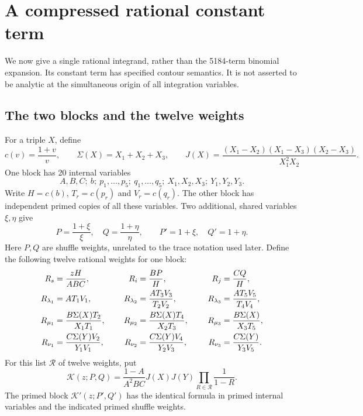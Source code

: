 \documentclass[11pt,letterpaper]{article}
\theoremstyle{remark}\newtheorem{remark}[theorem]{Remark}
\numberwithin{equation}{section}
\begin{document}
\section{A compressed rational constant term}\label{upo:rat:sec:kernel}
We now give a single rational integrand, rather than the 5184-term
binomial expansion. Its constant term has specified contour semantics.
It is not asserted to be analytic at the simultaneous origin of all
integration variables.

\subsection{The two blocks and the twelve weights}
For a triple $X$, define
\[
c(v)=\frac{1+v}{v},\qquad \Sigma(X)=X_1+X_2+X_3,
\qquad J(X)=\frac{(X_1-X_2)(X_1-X_3)(X_2-X_3)}{X_1^2X_2}.
\]
One block has 20 internal variables
\[
A,B,C;\ b;\ p_1,\ldots,p_5;\ q_1,\ldots,q_5;
\ X_1,X_2,X_3;\ Y_1,Y_2,Y_3.
\]
Write $H=c(b)$, $T_r=c(p_r)$ and $V_r=c(q_r)$.
The other block has independent primed copies of all these variables.
Two additional, shared variables $\xi,\eta$ give
\[
P=\frac{1+\xi}{\xi},\quad Q=\frac{1+\eta}{\eta},
\qquad P'=1+\xi,\quad Q'=1+\eta.
\]
Here $P,Q$ are shuffle weights, unrelated to the trace notation used
later. Define the following twelve rational weights for one block:
\begin{alignat}{3}
R_s&=\frac{zH}{ABC},&\qquad
R_i&=\frac{BP}{H},&\qquad R_j&=\frac{CQ}{H},\notag\\
R_{\lambda_1}&=AT_1V_1,&
R_{\lambda_2}&=\frac{AT_3V_3}{T_2V_2},&
R_{\lambda_3}&=\frac{AT_5V_5}{T_4V_4},\notag\\
R_{\mu_1}&=\frac{B\Sigma(X)T_2}{X_1T_1},&
R_{\mu_2}&=\frac{B\Sigma(X)T_4}{X_2T_3},&
R_{\mu_3}&=\frac{B\Sigma(X)}{X_3T_5},\label{upo:rat:eq:weights}\\
R_{\nu_1}&=\frac{C\Sigma(Y)V_2}{Y_1V_1},&
R_{\nu_2}&=\frac{C\Sigma(Y)V_4}{Y_2V_3},&
R_{\nu_3}&=\frac{C\Sigma(Y)}{Y_3V_5}.\notag
\end{alignat}
For this list $\mathcal R$ of twelve weights, put
\begin{equation}\label{upo:rat:eq:block}
\mathcal K(z;P,Q)=\frac{1-A}{A^2BC}J(X)J(Y)
\prod_{R\in\mathcal R}\frac1{1-R}.
\end{equation}
The primed block $\mathcal K'(z;P',Q')$ has the identical formula in
primed internal variables and the indicated primed shuffle weights.
\end{document}
